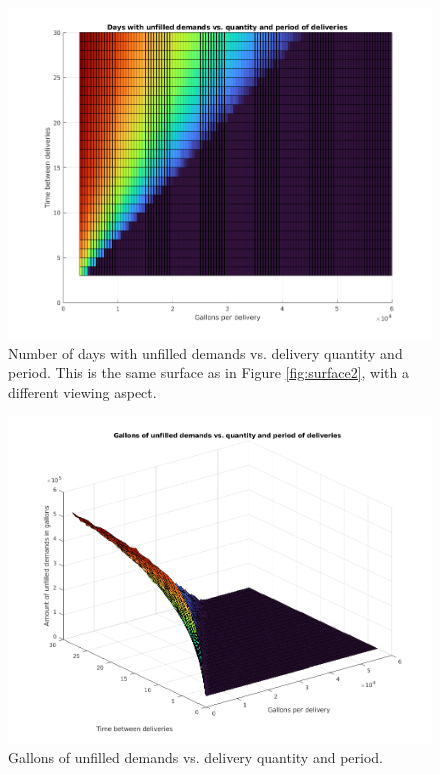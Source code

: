 \documentclass{article}
\begin{document}
    \begin{figure}[p]
        \centering
        \includegraphics[width=\textwidth]{surface2.1.png}
        \caption{Number of days with unfilled demands vs. delivery quantity and period. This is the same surface as in Figure \ref{fig:surface2}, with a different viewing aspect.}
        \label{fig:surface21}
    \end{figure}

    \begin{figure}[p]
        \centering
        \includegraphics[width=\textwidth]{surface3.png}
        \caption{Gallons of unfilled demands vs. delivery quantity and period.}
        \label{fig:surface3}
    \end{figure}
\end{document}
